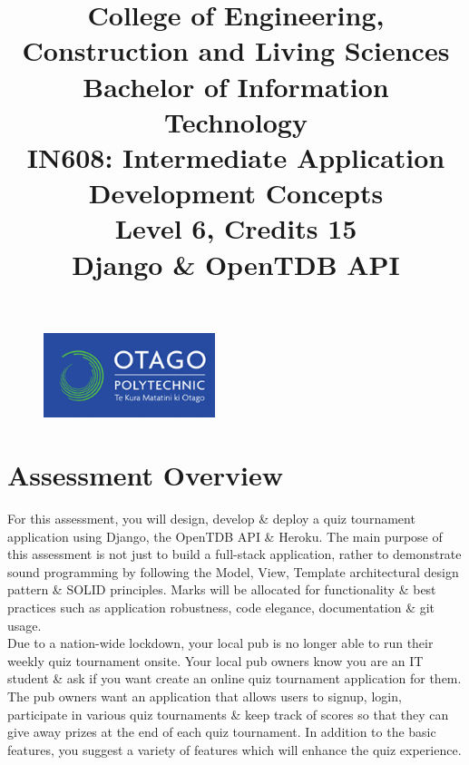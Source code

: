 \documentclass{article}
\author{}
\begin{document}
\begin{figure}
	\centering
	\includegraphics[width=50mm]{./img/logo.png}
\end{figure}

\title{College of Engineering, Construction and Living Sciences\\Bachelor of Information Technology\\IN608: Intermediate Application Development Concepts\\Level 6, Credits 15\\\textbf{Django \& OpenTDB API}}
\date{}
\maketitle

\section*{Assessment Overview}
For this assessment, you will design, develop \& deploy a quiz tournament application using Django, the OpenTDB API \& Heroku. The main purpose of this assessment is not just to build a full-stack application, rather to demonstrate sound programming by following the Model, View, Template architectural design pattern \& SOLID principles. Marks will be allocated for functionality \& best practices such as application robustness, code elegance, documentation \& git usage. \\

Due to a nation-wide lockdown, your local pub is no longer able to run their weekly quiz tournament onsite. Your local pub owners know you are an IT student \& ask if you want create an online quiz tournament application for them. The pub owners want an application that allows users to signup, login, participate in various quiz tournaments \& keep track of scores so that they can give away prizes at the end of each quiz tournament. In addition to the basic features, you suggest a variety of features which will enhance the quiz experience.
\end{document}
